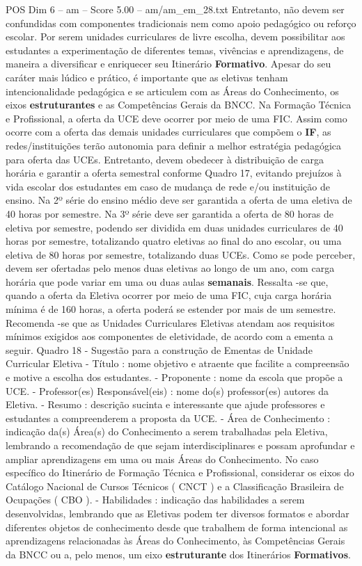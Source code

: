 \begin{textsample}{POS Dim 6 – am – Score 5.00 – am/am\_em\_28.txt}
Entretanto, não devem ser confundidas com componentes tradicionais nem como apoio pedagógico ou reforço escolar.
Por serem unidades curriculares de livre escolha, devem possibilitar aos estudantes a experimentação de diferentes temas, vivências e aprendizagens, de maneira a diversificar e enriquecer seu Itinerário \textbf{Formativo}.
Apesar do seu caráter mais lúdico e prático, é importante que as eletivas tenham intencionalidade pedagógica e se articulem com as Áreas do Conhecimento, os eixos \textbf{estruturantes} e as Competências Gerais da BNCC.
Na Formação Técnica e Profissional, a oferta da UCE deve ocorrer por meio de uma FIC.
Assim como ocorre com a oferta das demais unidades curriculares que compõem o \textbf{IF}, as redes/instituições terão autonomia para definir a melhor estratégia pedagógica para oferta das UCEs.
Entretanto, devem obedecer à distribuição de carga horária e garantir a oferta semestral conforme Quadro 17, evitando prejuízos à vida escolar dos estudantes em caso de mudança de rede e/ou instituição de ensino.
Na 2º série do ensino médio deve ser garantida a oferta de uma eletiva de 40 horas por semestre.
Na 3º série deve ser garantida a oferta de 80 horas de eletiva por semestre, podendo ser dividida em duas unidades curriculares de 40 horas por semestre, totalizando quatro eletivas ao final do ano escolar, ou uma eletiva de 80 horas por semestre, totalizando duas UCEs.
Como se pode perceber, devem ser ofertadas pelo menos duas eletivas ao longo de um ano, com carga horária que pode variar em uma ou duas aulas \textbf{semanais}.
Ressalta -se que, quando a oferta da Eletiva ocorrer por meio de uma FIC, cuja carga horária mínima é de 160 horas, a oferta poderá se estender por mais de um semestre.
Recomenda -se que as Unidades Curriculares Eletivas atendam aos requisitos mínimos exigidos aos componentes de eletividade, de acordo com a ementa a seguir.
Quadro 18 - Sugestão para a construção de Ementas de Unidade Curricular Eletiva - Título : nome objetivo e atraente que facilite a compreensão e motive a escolha dos estudantes. - Proponente : nome da escola que propõe a UCE. - Professor(es) Responsável(eis) : nome do(s) professor(es) autores da Eletiva. - Resumo : descrição sucinta e interessante que ajude professores e estudantes a compreenderem a proposta da UCE. - Área de Conhecimento : indicação da(s) Área(s) do Conhecimento a serem trabalhadas pela Eletiva, lembrando a recomendação de que sejam interdisciplinares e possam aprofundar e ampliar aprendizagens em uma ou mais Áreas do Conhecimento.
No caso específico do Itinerário de Formação Técnica e Profissional, considerar os eixos do Catálogo Nacional de Cursos Técnicos ( CNCT ) e a Classificação Brasileira de Ocupações ( CBO ). - Habilidades : indicação das habilidades a serem desenvolvidas, lembrando que as Eletivas podem ter diversos formatos e abordar diferentes objetos de conhecimento desde que trabalhem de forma intencional as aprendizagens relacionadas às Áreas do Conhecimento, às Competências Gerais da BNCC ou a, pelo menos, um eixo \textbf{estruturante} dos Itinerários \textbf{Formativos}.

\end{textsample}
